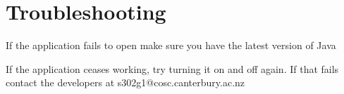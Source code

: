 \section{Troubleshooting}

If the application fails to open make sure you have the latest version of Java

If the application ceases working, try turning it on and off again. If that fails contact the developers at s302g1@cosc.canterbury.ac.nz